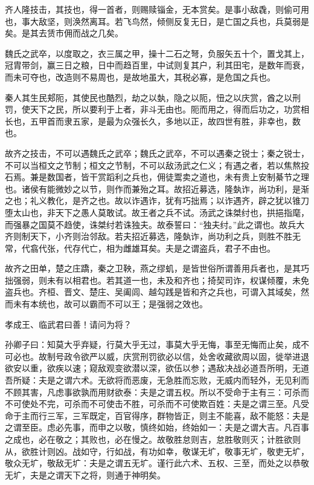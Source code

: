 \documentclass[]{article}
\begin{document}
齐人隆技击，其技也，得一首者，则赐赎锱金，无本赏矣。是事小敌毳，则偷可用也，事大敌坚，则涣然离耳。若飞鸟然，倾侧反复无日，是亡国之兵也，兵莫弱是矣。是其去赁市佣而战之几矣。

魏氏之武卒，以度取之，衣三属之甲，操十二石之弩，负服矢五十个，置戈其上，冠胄带剑，赢三日之粮，日中而趋百里，中试则复其户，利其田宅，是数年而衰，而未可夺也，改造则不易周也，是故地虽大，其税必寡，是危国之兵也。

秦人其生民郏阨，其使民也酷烈，劫之以埶，隐之以阨，忸之以庆赏，酋之以刑罚，使天下之民，所以要利于上者，非斗无由也。阨而用之，得而后功之，功赏相长也，五甲首而隶五家，是最为众强长久，多地以正，故四世有胜，非幸也，数也。

故齐之技击，不可以遇魏氏之武卒；魏氏之武卒，不可以遇秦之锐士；秦之锐士，不可以当桓文之节制；桓文之节制，不可以敌汤武之仁义；有遇之者，若以焦熬投石焉。兼是数国者，皆干赏蹈利之兵也，佣徒鬻卖之道也，未有贵上安制綦节之理也。诸侯有能微妙之以节，则作而兼殆之耳。故招近募选，隆埶诈，尚功利，是渐之也；礼义教化，是齐之也。故以诈遇诈，犹有巧拙焉；以诈遇齐，辟之犹以锥刀堕太山也，非天下之愚人莫敢试。故王者之兵不试。汤武之诛桀纣也，拱挹指麾，而强暴之国莫不趋使，诛桀纣若诛独夫。故泰誓曰：``独夫纣。''此之谓也。故兵大齐则制天下，小齐则治邻敌。若夫招近募选，隆埶诈，尚功利之兵，则胜不胜无常，代翕代张，代存代亡，相为雌雄耳矣。夫是之谓盗兵，君子不由也。

故齐之田单，楚之庄蹻，秦之卫鞅，燕之缪虮，是皆世俗所谓善用兵者也，是其巧拙强弱，则未有以相君也。若其道一也，未及和齐也；掎契司诈，权谋倾覆，未免盗兵也。齐桓、晋文、楚庄、吴阖闾、越勾践是皆和齐之兵也，可谓入其域矣，然而未有本统也，故可以霸而不可以王；是强弱之效也。

孝成王、临武君曰善！请问为将？

孙卿子曰：知莫大乎弃疑，行莫大乎无过，事莫大乎无悔，事至无悔而止矣，成不可必也。故制号政令欲严以威，庆赏刑罚欲必以信，处舍收藏欲周以固，徙举进退欲安以重，欲疾以速；窥敌观变欲潜以深，欲伍以参；遇敌决战必道吾所明，无道吾所疑：夫是之谓六术。无欲将而恶废，无急胜而忘败，无威内而轻外，无见利而不顾其害，凡虑事欲孰而用财欲泰：夫是之谓五权。所以不受命于主有三：可杀而不可使处不完，可杀而不可使击不胜，可杀而不可使欺百姓：夫是之谓三至。凡受命于主而行三军，三军既定，百官得序，群物皆正，则主不能喜，敌不能怒：夫是之谓至臣。虑必先事，而申之以敬，慎终如始，终始如一：夫是之谓大吉。凡百事之成也，必在敬之；其败也，必在慢之。故敬胜怠则吉，怠胜敬则灭；计胜欲则从，欲胜计则凶。战如守，行如战，有功如幸，敬谋无圹，敬事无圹，敬吏无圹，敬众无圹，敬敌无圹：夫是之谓五无圹。谨行此六术、五权、三至，而处之以恭敬无圹，夫是之谓天下之将，则通于神明矣。
\end{document}
